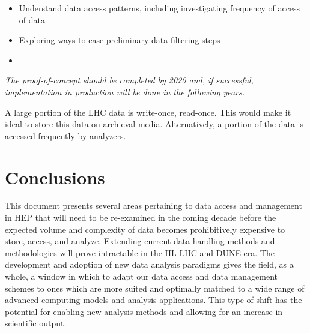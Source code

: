 \documentclass[12pt,a4paper]{article}
\begin{document}
\begin{itemize}
\item Understand data access patterns, including investigating frequency of access of data
\item Exploring ways to ease preliminary data filtering steps
\item \end{itemize}
\emph{The  proof-of-concept should be completed by 2020 and, if successful, implementation in
production will be done in the following years.}


A large portion of the LHC data is write-once, read-once. This would make it ideal to store this data on archieval media. Alternatively, a portion of the data is accessed frequently by analyzers.

\section{Conclusions}\label{conclusions}

This document presents several
areas pertaining to data access and management in HEP that will need to
be re-examined in the coming decade before the expected volume and
complexity of data becomes prohibitively expensive to store, access, and
analyze. Extending current data handling methods and methodologies will
prove intractable in the HL-LHC and DUNE era. The development and
adoption of new data analysis paradigms gives the field, as a whole, a
window in which to adapt our data access and data management schemes to
ones which are more suited and optimally matched to a wide range of
advanced computing models and analysis applications. This type of shift
has the potential for enabling new analysis methods and allowing for an
increase in scientific output.


\sloppy
\raggedright
\clearpage
\printbibliography[title={References},heading=bibintoc]
\end{document}
